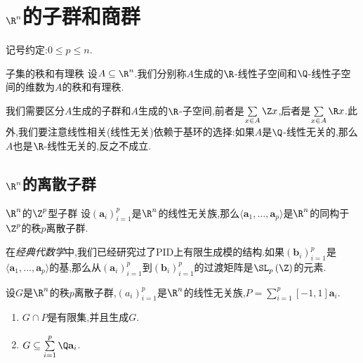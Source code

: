 \chapter{\texorpdfstring{$\R^{n}$}{Rn}的子群和商群}

记号约定:$0\leq p\leq n$.

\begin{definition}{子集的秩和有理秩}{}
	设$A\subseteq\R^{n}$.我们分别称$A$生成的$\R$-线性子空间和$\Q$-线性子空间的维数为$A$的秩和有理秩.
\end{definition}

\begin{alarm}{}{}
	我们需要区分$A$生成的子群和$A$生成的$\R$-子空间,前者是$\sum\limits_{x\in A}\Z x$,后者是$\sum\limits_{x\in A}\R x$.此外,我们要注意线性相关(线性无关)依赖于基环的选择:如果$A$是$\Q$-线性无关的,那么$A$也是$\R$-线性无关的,反之不成立.
\end{alarm}

\section{\texorpdfstring{$\R^{n}$}{Rn}的离散子群}

\begin{example}{$\R^{n}$的$\Z^{p}$型子群}{}
	设$\left(\mathbf{a}_{i}\right)_{i=1}^{p}$是$\R^{n}$的线性无关族,那么$\langle\mathbf{a}_{1},\ldots,\mathbf{a}_{p}\rangle$是$\R^{n}$的同构于$\Z^{p}$的秩$p$离散子群.
\end{example}

\begin{remark}{}{}
	在\textit{经典代数学}中,我们已经研究过了PID上有限生成模的结构.如果$\left(\mathbf{b}_{i}\right)_{i=1}^{p}$是$\langle\mathbf{a}_{1},\ldots,\mathbf{a}_{p}\rangle$的基,那么从$\left(\mathbf{a}_{i}\right)_{i=1}^{p}$到$\left(\mathbf{b}_{i}\right)_{i=1}^{p}$的过渡矩阵是$\SL_{p}\left(\Z\right)$的元素.
\end{remark}

\begin{proposition}{}{}
	设$G$是$\R^{n}$的秩$p$离散子群,$\left(a_{i}\right)_{i=1}^{p}$是$\R^{n}$的线性无关族,$P=\sum\limits_{i=1}^{p}\left[-1,1\right]\mathbf{a}_{i}$.
	\begin{enumerate}
		\item $G\cap P$是有限集,并且生成$G$.
		\item $G\subseteq\sum\limits_{i=1}^{p}\Q\mathbf{a}_{i}$.
	\end{enumerate}
\end{proposition}

